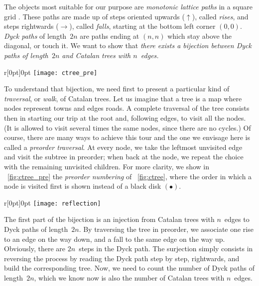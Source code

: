 The objects most suitable for our purpose are \emph{monotonic lattice
  paths} in a square grid
\citep{Mohanty_1979,Humphreys_2010}. These paths are made up of steps
oriented upwards (\(\uparrow\)), called \emph{rises}, and steps
rightwards (\(\rightarrow\)), called \emph{falls}, starting at the
bottom left corner \((0,0)\). \emph{Dyck paths} of
length~\(2n\) are paths ending at \((n,n)\) which stay above the
diagonal, or touch it. We want to show that \emph{there exists a
  bijection between Dyck paths of length~\(2n\) and Catalan trees with
  \(n\)~edges.}

\begin{wrapfigure}[7]{r}[0pt]{0pt}
\centering
\texttt{[image: ctree\_pre]}
\caption{}
\label{fig:ctree_pre}
\end{wrapfigure}
To understand that bijection, we need first to present a particular
kind of \emph{traversal}, or
\emph{walk}, of Catalan trees. Let us
imagine that a tree is a map where nodes represent towns and edges
roads. A complete traversal of the tree consists then in starting our
trip at the root and, following edges, to visit all the nodes. (It is
allowed to visit several times the same nodes, since there are no
cycles.) Of course, there are many ways to achieve this tour and the
one we envisage here is called a \emph{preorder traversal}. At every
node, we take the leftmost unvisited edge and visit the subtree in
preorder; when back at the node, we repeat the choice with the
remaining unvisited children. For more clarity, we show in
\fig~\ref{fig:ctree_pre} the \emph{preorder
numbering} of
\fig~\ref{fig:ctree}, where the order in which a node is visited first
is shown instead of a black disk \((\bullet)\).

\begin{wrapfigure}[13]{r}[0pt]{0pt}
\centering
\texttt{[image: reflection]}
\caption{Reflection of a prefix w.r.t. \(y = x - 1\)}
\label{fig:reflection}
\end{wrapfigure}
The first part of the bijection is an injection from Catalan trees
with \(n\)~edges to Dyck paths of length~\(2n\). By traversing the
tree in preorder, we associate one rise to an edge on the way down,
and a fall to the same edge on the way up. Obviously, there are
\(2n\)~steps in the Dyck path. The surjection simply consists in
reversing the process by reading the Dyck path step by step,
rightwards, and build the corresponding tree. Now, we need to count
the number of Dyck paths of length~\(2n\), which we know now is also
the number of Catalan trees with \(n\)~edges.

